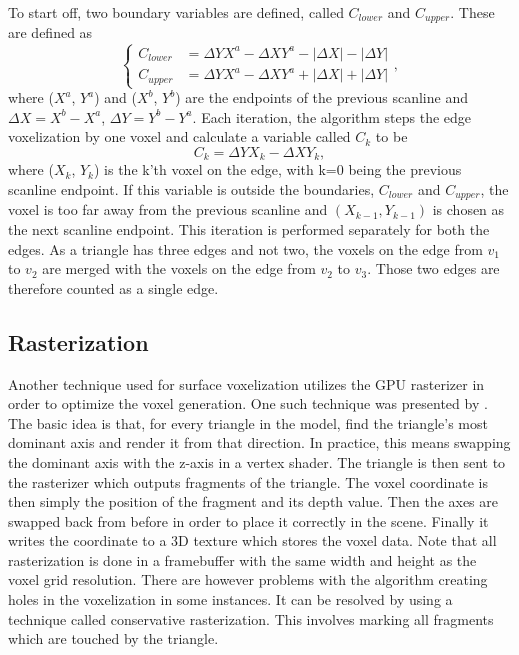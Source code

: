 To start off, two boundary variables are defined, called $C_{lower}$ and $C_{upper}$.
These are defined as
\begin{equation*}
  \left\{
    \begin{aligned}
      C_{lower} &= \Delta Y X^a - \Delta X Y^a - |\Delta X| - |\Delta Y|\\
      C_{upper} &= \Delta Y X^a - \Delta X Y^a + |\Delta X| + |\Delta Y|
    \end{aligned}
  \right.,
\end{equation*}
where ($X^a$, $Y^a$) and ($X^b$, $Y^b$) are the endpoints of the previous scanline and $\Delta X = X^b - X^a$, $\Delta Y = Y^b - Y^a$.
Each iteration, the algorithm steps the edge voxelization by one voxel and calculate a variable called $C_k$ to be
$$ C_k = \Delta Y X_k - \Delta X Y_k, $$
where ($X_k$, $Y_k$) is the k'th voxel on the edge, with k=0 being the previous scanline endpoint.
If this variable is outside the boundaries, $C_{lower}$ and $C_{upper}$, the voxel is too far away from the previous scanline and $(X_{k-1},Y_{k-1})$ is chosen as the next scanline endpoint. 
This iteration is performed separately for both the edges.
As a triangle has three edges and not two, the voxels on the edge from $v_1$ to $v_2$ are merged with the voxels on the edge from $v_2$ to $v_3$.
Those two edges are therefore counted as a single edge.

\subsection{Rasterization}
Another technique used for surface voxelization utilizes the GPU rasterizer in order to optimize the voxel generation.
One such technique was presented by .
The basic idea is that, for every triangle in the model, find the triangle's most dominant axis and render it from that direction. 
In practice, this means swapping the dominant axis with the z-axis in a vertex shader.
The triangle is then sent to the rasterizer which outputs fragments of the triangle.
The voxel coordinate is then simply the position of the fragment and its depth value.
Then the axes are swapped back from before in order to place it correctly in the scene.
Finally it writes the coordinate to a 3D texture which stores the voxel data.
Note that all rasterization is done in a framebuffer with the same width and height as the voxel grid resolution.
There are however problems with the algorithm creating holes in the voxelization in some instances.
It can be resolved by using a technique called conservative rasterization.
This involves marking all fragments which are touched by the triangle. 


